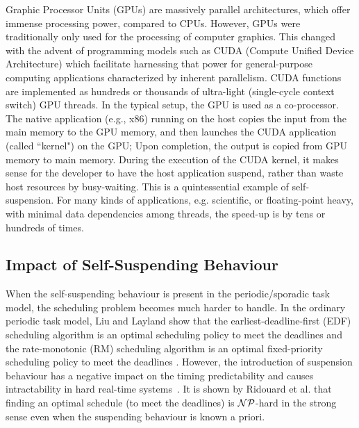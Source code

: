 Graphic Processor Units (GPUs) are massively parallel architectures, which offer immense processing power, compared to CPUs. 
However, GPUs were traditionally only used for the processing of computer graphics. This changed with the advent of programming
models such as CUDA (Compute Unified Device Architecture) which facilitate harnessing that power for general-purpose computing 
applications characterized by inherent parallelism. CUDA functions are implemented as hundreds or thousands of ultra-light 
(single-cycle context switch) GPU threads. 
In the typical setup, the GPU is used as a co-processor. The native application (e.g., x86) running on the host
copies the input from the main memory to the GPU memory, and then launches the CUDA application (called ``kernel") on the GPU;
Upon completion, the output is copied from GPU memory to main memory. During the execution of the CUDA kernel, it makes sense for the 
developer to have the host application suspend, rather than waste host resources by busy-waiting. This is a quintessential example of 
self-suspension. For many kinds of applications, e.g. scientific, or floating-point heavy, with minimal data dependencies among 
threads, the speed-up is by tens or hundreds of times.


\subsection{Impact of Self-Suspending Behaviour}

When the self-suspending behaviour is present in the periodic/sporadic task model, the scheduling problem becomes much harder to handle. In the ordinary periodic task model, Liu and Layland show that the earliest-deadline-first (EDF) scheduling algorithm is an optimal scheduling policy to meet the deadlines and the rate-monotonic (RM) scheduling algorithm is an optimal fixed-priority scheduling policy to meet the deadlines \cite{Liu_1973}. However, the introduction of suspension behaviour has a negative impact on the timing predictability and causes intractability in hard real-time systems~\cite{Ridouard_2004}. It is shown by Ridouard et al. \cite{Ridouard_2004} that finding an optimal schedule (to meet the deadlines) is ${\cal NP}$-hard in the strong sense even when the suspending behaviour is known a priori.


